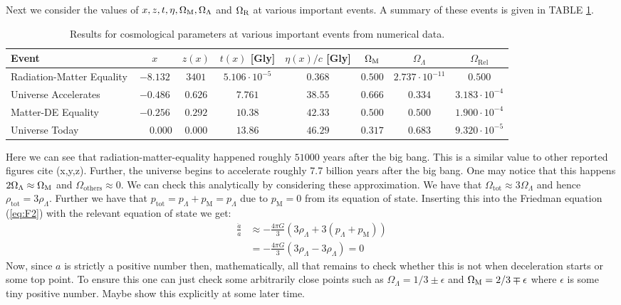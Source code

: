 \documentclass[%
reprint,
 amsmath,amssymb,
 aps,
]{revtex4-2}
\begin{document}
Next we consider the values of $x,z,t,\eta,\Omega_\text M, \Omega_\Lambda$ and $\Omega_\text R$ at various important events. A summary of these events is given in TABLE \ref{tab:cosmo_events}.
\renewcommand{\arraystretch}{1.25}
\begin{table}[ht!] %
	\caption{Results for cosmological parameters at various important events from numerical data.}
	\begin{tabular}{|l|c|c|c|c|c|c|c|}
		\hline
		Event & $x$ & $z(x)$ & $t(x)$ [Gly] & $\eta(x)/c$ [Gly] & $\Omega_\text M$ & $\Omega_{\Lambda}$ & $\Omega_{\text{Rel}}$ \\
		\hline
		Radiation-Matter Equality  & $-8.132$ & $3401$ & $5.106 \cdot 10^{-5}$ & $0.368$ & $0.500$ & $2.737 \cdot 10^{-11}$ & $0.500$ \\
		\hline
		Universe Accelerates & $-0.486$ & $0.626$ & $7.761$ & $38.55$ & $0.666$ & $0.334$ & $3.183\cdot10^{-4}$ \\
		\hline
		Matter-DE Equality & $-0.256$ & $0.292$ & $10.38$ & $42.33$ & $0.500$ & $0.500$ & $1.900\cdot10^{-4}$ \\
		\hline
		Universe Today & $\phantom{-}0.000 $ & $0.000 $ & $13.86$ & $46.29$ & $0.317$ & $0.683$ & $9.320 \cdot 10^{-5}$ \\
		\hline
	\end{tabular}
	\label{tab:cosmo_events}
\end{table}

Here we can see that radiation-matter-equality happened roughly $51000$ years after the big bang. This is a similar value to other reported figures cite (x,y,z). Further, the universe begins to accelerate roughly 7.7 billion years after the big bang. One may notice that this happens $2\Omega_{\Lambda}\approx\Omega_{\text M}$ and $\Omega_{\text{others}}\approx0$. We can check this analytically by considering these approximation. We have that $\Omega_{\text{tot}}\approx3\Omega_{\Lambda}$ and hence $\rho_\text{tot}=3\rho_\Lambda$. Further we have that $p_\text{tot}=p_\Lambda+p_\text{M}=p_\Lambda$ due to $p_\text{M}=0$ from its equation of state. Inserting this into the Friedman equation (\ref{eq:F2}) with the relevant equation of state we get:
\begin{align*}
	\frac{\ddot{a}}{a}&\approx -\frac{4\pi G}{3}(3\rho_\Lambda+3(p_\Lambda+p_\text{M}))\\
	&=-\frac{4\pi G}{3}(3\rho_\Lambda-3\rho_\Lambda)=0
\end{align*}
Now, since $a$ is strictly a positive number then, mathematically, all that remains to check whether this is not when deceleration starts or some top point. To ensure this one can just check some arbitrarily close points such as $\Omega_{\Lambda}=1/3\pm\epsilon$ and $\Omega_{\text M}=2/3\mp\epsilon$ where $\epsilon$ is some tiny positive number. \color{red} Maybe show this explicitly at some later time. \color{black}
\end{document}
